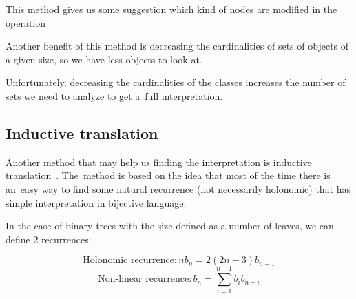 \documentclass[final]{article}
\theoremstyle{definition}
\theoremstyle{definition}
\theoremstyle{remark}
\newcommand{\includeinlinescaledsvg}[3]{\begin{minipage}{#1\textwidth}\begin{center}\end{center}\end{minipage}}
\begin{document}
\begin{longtable}{| c | c |}
\end{longtable}

This method gives us some suggestion which kind of nodes are modified in the operation

Another benefit of this method is decreasing the cardinalities of sets of objects of a given size, so we have less objects to look at.

Unfortunately, decreasing the cardinalities of the classes increases the number of sets we need to analyze to get a~full interpretation.

\subsection{Inductive translation}%
\label{sub:inductive_translation}

Another method that may help us finding the interpretation is inductive translation~\cite{doron}. The~method is based on the idea that most of the time there is an~easy way to find some natural recurrence (not necessarily holonomic) that has simple interpretation in bijective language.

In the case of binary trees with the size defined as a number of leaves, we can define 2 recurrences:

\[\text{Holonomic recurrence} : n b_{n} = 2 (2n - 3) b_{n - 1}\]
\[\text{Non-linear recurrence} : b_{n} = \sum_{i=1}^{n - 1} b_{i} b_{n - i}\]
\end{document}

